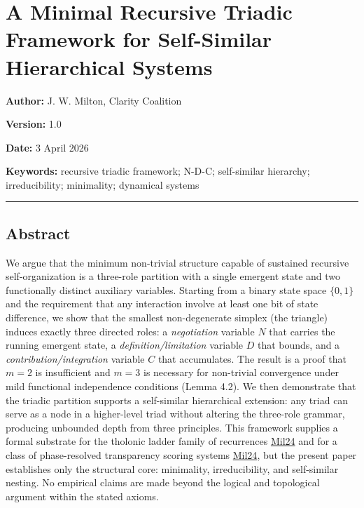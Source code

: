 \documentclass[
  11pt,
  letterpaper,
]{article}
\author{}
\date{}
\begin{document}
\section{A Minimal Recursive Triadic Framework for Self-Similar
Hierarchical
Systems}\label{a-minimal-recursive-triadic-framework-for-self-similar-hierarchical-systems}

\textbf{Author:} J. W. Milton, Clarity Coalition

\textbf{Version:} 1.0

\textbf{Date:} 3 April 2026

\textbf{Keywords:} recursive triadic framework; N-D-C; self-similar
hierarchy; irreducibility; minimality; dynamical systems

\begin{center}\rule{0.5\linewidth}{0.5pt}\end{center}

\subsection{Abstract}\label{abstract}

We argue that the minimum non-trivial structure capable of sustained
recursive self-organization is a three-role partition with a single
emergent state and two functionally distinct auxiliary variables.
Starting from a binary state space \(\{0, 1\}\) and the requirement that
any interaction involve at least one bit of state difference, we show
that the smallest non-degenerate simplex (the triangle) induces exactly
three directed roles: a \emph{negotiation} variable \(N\) that carries
the running emergent state, a \emph{definition/limitation} variable
\(D\) that bounds, and a \emph{contribution/integration} variable \(C\)
that accumulates. The result is a proof that \(m = 2\) is insufficient
and \(m = 3\) is necessary for non-trivial convergence under mild
functional independence conditions (Lemma 4.2). We then demonstrate that
the triadic partition supports a self-similar hierarchical extension:
any triad can serve as a node in a higher-level triad without altering
the three-role grammar, producing unbounded depth from three principles.
This framework supplies a formal substrate for the tholonic ladder
family of recurrences \href{https://tholonia.github.io/the-book/}{Mil24}
and for a class of phase-resolved transparency scoring systems
\href{https://tholonia.github.io/the-book/}{Mil24}, but the present
paper establishes only the structural core: minimality, irreducibility,
and self-similar nesting. No empirical claims are made beyond the
logical and topological argument within the stated axioms.
\end{document}
